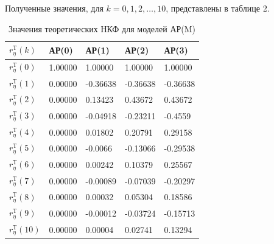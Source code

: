 \documentclass[12pt, fleqn]{article}
\begin{document}
{{		Полученные значения, для $k = 0,1,2,\dots,10$, представлены в таблице 2.
		\begin{table}[H]\label{tbl_ncf_ar}
			\centering
			\caption{Значения теоретических НКФ для моделей АР(M)}
			\begin{tabularx}{0.9\textwidth}{ |Y|Y|Y|Y|Y| }
				\hline
				$r_{\eta}^{\text{Т}}(k)$  & АР(0) & АР(1) & АР(2)  & АР(3)  \\ \hline
				$r_{\eta}^{\text{Т}}(0)$  & 1.00000 & 1.00000 & 1.00000  & 1.00000  \\ \hline
				$r_{\eta}^{\text{Т}}(1)$  & 0.00000 &-0.36638 & -0.36638 & -0.36638  \\ \hline
				$r_{\eta}^{\text{Т}}(2)$  & 0.00000 & 0.13423 &0.43672 & 0.43672 \\ \hline
				$r_{\eta}^{\text{Т}}(3)$  & 0.00000 & -0.04918 &-0.23211 & -0.4559 \\ \hline
				$r_{\eta}^{\text{Т}}(4)$  & 0.00000 & 0.01802 &0.20791 & 0.29158 \\ \hline
				$r_{\eta}^{\text{Т}}(5)$  & 0.00000 & -0.0066 &-0.13066  & -0.29538  \\ \hline
				$r_{\eta}^{\text{Т}}(6)$  & 0.00000 & 0.00242 & 0.10379  & 0.25567  \\ \hline
				$r_{\eta}^{\text{Т}}(7)$  & 0.00000 & -0.00089 & -0.07039 & -0.20297  \\ \hline
				$r_{\eta}^{\text{Т}}(8)$  & 0.00000 & 0.00032 & 0.05304 &0.18586  \\ \hline
				$r_{\eta}^{\text{Т}}(9)$  & 0.00000 & -0.00012 & -0.03724 & -0.15713 \\ \hline
				$r_{\eta}^{\text{Т}}(10)$ & 0.00000 & 0.00004 &0.02741   & 0.13294 \\ \hline
			\end{tabularx}
		\end{table}
									
}}
\end{document}
